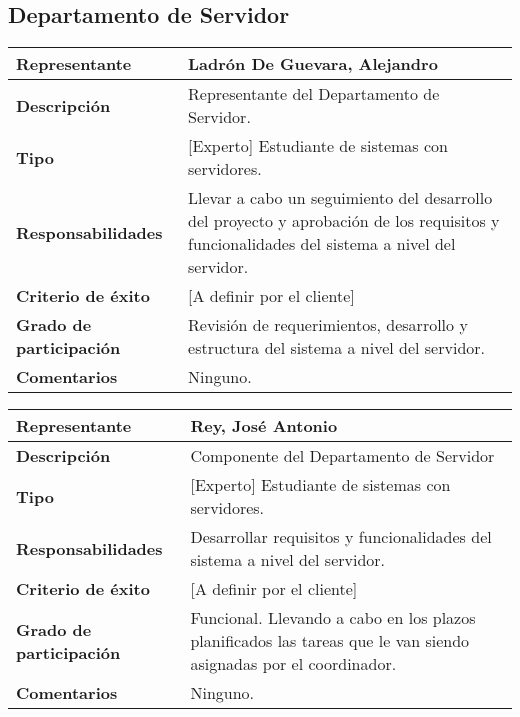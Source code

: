     \subsection{Departamento de Servidor}
        \begin{tabular}{|p{4cm}|p{12cm}|}
            \hline \textbf{Representante} &  Ladrón De Guevara, Alejandro\\
            \hline \textbf{Descripción} & Representante del Departamento de Servidor. \\
            \hline \textbf{Tipo} &  [Experto] Estudiante de sistemas con servidores. \\
            \hline \textbf{Responsabilidades} & Llevar a cabo un seguimiento del desarrollo del proyecto y aprobación de  los requisitos y funcionalidades del sistema a nivel del servidor. \\
            \hline \textbf{Criterio de éxito} & [A definir por el cliente] \\
            \hline \textbf{Grado de participación} & Revisión de requerimientos, desarrollo y estructura del sistema a nivel del servidor. \\
            \hline \textbf{Comentarios} &  Ninguno. \\
            \hline
        \end{tabular}

        \begin{tabular}{|p{4cm}|p{12cm}|}
            \hline \textbf{Representante} & Rey, José Antonio \\
            \hline \textbf{Descripción} & Componente del Departamento de Servidor  \\
            \hline \textbf{Tipo} & [Experto] Estudiante de sistemas con servidores. \\
            \hline \textbf{Responsabilidades} & Desarrollar requisitos y funcionalidades del sistema a nivel del servidor. \\
            \hline \textbf{Criterio de éxito} & [A definir por el cliente] \\
            \hline \textbf{Grado de participación} & Funcional. Llevando a cabo en los plazos planificados las tareas que le van siendo asignadas por el coordinador. \\
            \hline \textbf{Comentarios} & Ninguno. \\
            \hline
        \end{tabular}

